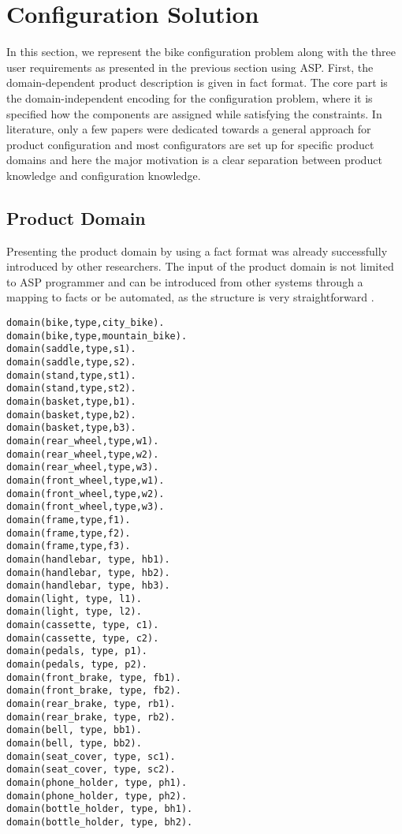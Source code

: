 \section{Configuration Solution}\label{sec: Configuration Solution}

In this section, we represent the bike configuration problem along with the three user requirements as presented in the previous section using ASP.
First, the domain-dependent product description is given in fact format.
The core part is the domain-independent encoding for the configuration problem, where it is specified how the components are assigned while satisfying the constraints. 
In literature, only a few papers were dedicated towards a general approach for product configuration \cite{chjojoberi99a, sotimasu98a} and most configurators are set up for specific product domains \cite{fefaateruraz17a, fahakrscscta20a} and here the major motivation is a clear separation between product knowledge and configuration knowledge.

\subsection{Product Domain}
\lstset{numbers=left,frame = single, breaklines=true,
    breakatwhitespace=true,}
Presenting the product domain by using a fact format was already successfully introduced by other researchers. The input of the product domain is not limited to ASP programmer and can be introduced from other systems through a mapping to facts or be automated, as the structure is very straightforward \cite{bulera05ricochet, bainkaokscsotawa18a}. \newline


\begin{lstlisting}[caption = {Product Domain}, basicstyle=\ttfamily, label = {domain}]
domain(bike,type,city_bike). 
domain(bike,type,mountain_bike).
domain(saddle,type,s1). 
domain(saddle,type,s2).
domain(stand,type,st1). 
domain(stand,type,st2).
domain(basket,type,b1). 
domain(basket,type,b2).
domain(basket,type,b3).
domain(rear_wheel,type,w1).
domain(rear_wheel,type,w2).
domain(rear_wheel,type,w3).
domain(front_wheel,type,w1).
domain(front_wheel,type,w2).
domain(front_wheel,type,w3). 
domain(frame,type,f1). 
domain(frame,type,f2). 
domain(frame,type,f3).
domain(handlebar, type, hb1). 
domain(handlebar, type, hb2). 
domain(handlebar, type, hb3).
domain(light, type, l1). 
domain(light, type, l2).
domain(cassette, type, c1). 
domain(cassette, type, c2).
domain(pedals, type, p1). 
domain(pedals, type, p2).
domain(front_brake, type, fb1). 
domain(front_brake, type, fb2).
domain(rear_brake, type, rb1). 
domain(rear_brake, type, rb2).
domain(bell, type, bb1). 
domain(bell, type, bb2).
domain(seat_cover, type, sc1). 
domain(seat_cover, type, sc2).
domain(phone_holder, type, ph1). 
domain(phone_holder, type, ph2).
domain(bottle_holder, type, bh1). 
domain(bottle_holder, type, bh2).
\end{lstlisting} 

